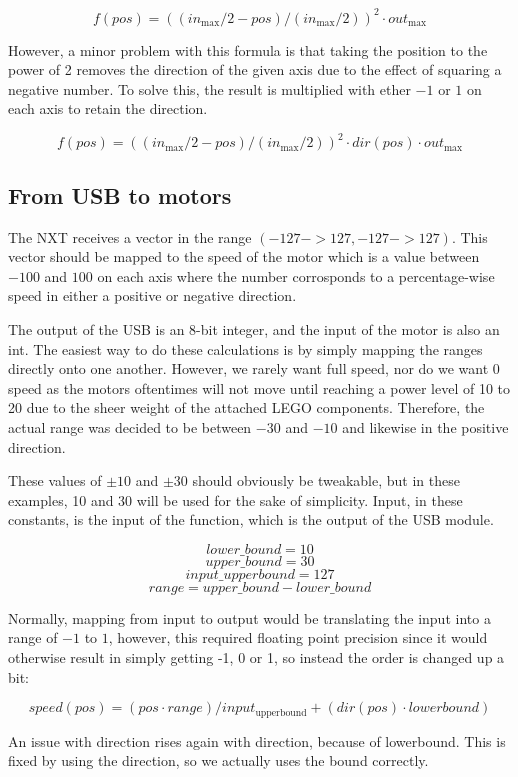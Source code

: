 $$
f(pos) = ((in_\text{max}/2 - pos)/(in_\text{max}/2))^2 \cdot out_\text{max}
$$

However, a minor problem with this formula is that taking the position to the power of 2 removes the direction of the given axis due to the effect of squaring a negative number.
To solve this, the result is multiplied with ether $-1$ or $1$ on each axis to retain the direction.

$$
f(pos) = ((in_\text{max}/2 - pos)/(in_\text{max}/2))^2 \cdot dir(pos) \cdot out_\text{max}
$$

\subsection{From USB to motors}
The NXT receives a vector in the range $(-127 -> 127, -127 -> 127)$.
This vector should be mapped to the speed of the motor which is a value between $-100$ and $100$ on each axis where the number corrosponds to a percentage-wise speed in either a positive or negative direction.

The output of the USB is an 8-bit integer, and the input of the motor is also an int.
The easiest way to do these calculations is by simply mapping the ranges directly onto one another.
However, we rarely want full speed, nor do we want 0 speed as the motors oftentimes will not move until reaching a power level of 10 to 20 due to the sheer weight of the attached LEGO components.
Therefore, the actual range was decided to be between $-30$ and $-10$ and likewise in the positive direction.

These values of $\pm10$ and $\pm30$ should obviously be tweakable, but in these examples, 10 and 30 will be used for the sake of simplicity. 
Input, in these constants, is the input of the function, which is the output of the USB module.

	$$lower\_bound = 10$$
	$$upper\_bound = 30$$
	$$input\_upperbound = 127$$
	$$range = upper\_bound - lower\_bound$$

Normally, mapping from input to output would be translating the input into a range of $-1$ to $1$, however, this required floating point precision since it would otherwise result in simply getting -1, 0 or 1, so instead the order is changed up a bit:

$$
speed(pos) = (pos \cdot range)/input_\text{upperbound} + (dir(pos) \cdot lowerbound)
$$

An issue with direction rises again with direction, because of lowerbound.
This is fixed by using the direction, so we actually uses the bound correctly.
